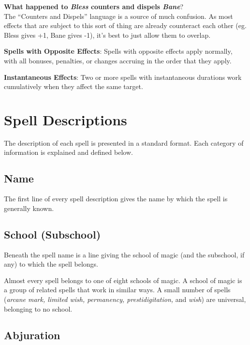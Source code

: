 \begin{formal}
 \textbf{What happened to \textit{Bless} counters and dispels \textit{Bane}}? \\
 The ``Counters and Dispels'' language is a source of much confusion. As most effects that are subject to this sort of thing are
 already counteract each other (eg. Bless gives +1, Bane gives -1), it's best to just allow them to overlap.
\end{formal}

\textbf{Spells with Opposite Effects}: Spells with opposite effects apply normally, with all bonuses, penalties, or changes accruing in the order that they apply.

\textbf{Instantaneous Effects}: Two or more spells with instantaneous durations work cumulatively when they affect the same target.
				
\section{Spell Descriptions}

				
The description of each spell is presented in a standard format. Each category of information is explained and defined below.
				
\subsection{Name}

				
The first line of every spell description gives the name by which the spell is generally known.
				
\subsection{School (Subschool)}

				
Beneath the spell name is a line giving the school of magic (and the subschool, if any) to which the spell belongs.
				
Almost every spell belongs to one of eight schools of magic. A school of magic is a group of related spells that work in similar ways. A small number of spells (\textit{arcane mark, limited wish, permanency, prestidigitation, }and \textit{wish}) are universal, belonging to no school.
				
\subsection{Abjuration}

